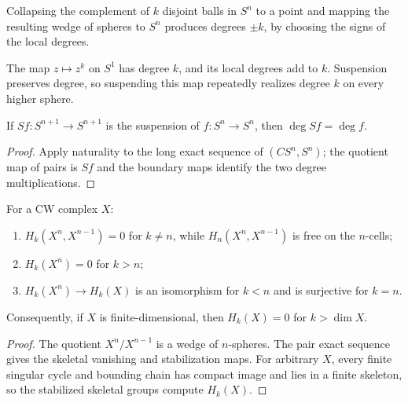\begin{example}
\label{ex:degree-reflection-antipodal}
Collapsing the complement of $k$ disjoint balls in $S^n$ to a point and mapping the resulting wedge of spheres to $S^n$ produces degrees $\pm k$, by choosing the signs of the local degrees.
\end{example}

\begin{example}
\label{ex:degree-suspension}
The map $z\mapsto z^k$ on $S^1$ has degree $k$, and its local degrees add to $k$.  Suspension preserves degree, so suspending this map repeatedly realizes degree $k$ on every higher sphere.
\end{example}

\begin{proposition}
\label{prop:homology-cw-complexes}
If $Sf:S^{n+1}\to S^{n+1}$ is the suspension of $f:S^n\to S^n$, then $\deg Sf=\deg f$.
\end{proposition}
\begin{proof}
\sketch Apply naturality to the long exact sequence of $(CS^n,S^n)$; the quotient map of pairs is $Sf$ and the boundary maps identify the two degree multiplications.
\end{proof}

\begin{lemma}
\label{lem:homology-cw-skeleton-pairs}
For a CW complex $X$:
\begin{enumerate}
\item $H_k(X^n,X^{n-1})=0$ for $k\ne n$, while $H_n(X^n,X^{n-1})$ is free on the $n$-cells;
\item $H_k(X^n)=0$ for $k>n$;
\item $H_k(X^n)\to H_k(X)$ is an isomorphism for $k<n$ and is surjective for $k=n$.
\end{enumerate}
Consequently, if $X$ is finite-dimensional, then $H_k(X)=0$ for
$k>\dim X$.
\end{lemma}
\begin{proof}
\sketch The quotient $X^n/X^{n-1}$ is a wedge of $n$-spheres. The pair exact
sequence gives the skeletal vanishing and stabilization maps. For arbitrary
$X$, every finite singular cycle and bounding chain has compact image and lies
in a finite skeleton, so the stabilized skeletal groups compute $H_k(X)$.
\end{proof}

